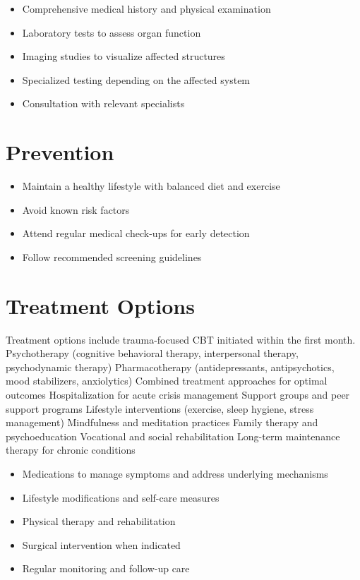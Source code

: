 \begin{itemize}[noitemsep]
  \item Comprehensive medical history and physical examination
  \item Laboratory tests to assess organ function
  \item Imaging studies to visualize affected structures
  \item Specialized testing depending on the affected system
  \item Consultation with relevant specialists
\end{itemize}
\section{Prevention}
\begin{itemize}[noitemsep]
  \item Maintain a healthy lifestyle with balanced diet and exercise
  \item Avoid known risk factors
  \item Attend regular medical check-ups for early detection
  \item Follow recommended screening guidelines
\end{itemize}
\section{Treatment Options}
Treatment options include trauma-focused CBT initiated within the first month. Psychotherapy (cognitive behavioral therapy, interpersonal therapy, psychodynamic therapy) Pharmacotherapy (antidepressants, antipsychotics, mood stabilizers, anxiolytics) Combined treatment approaches for optimal outcomes Hospitalization for acute crisis management Support groups and peer support programs Lifestyle interventions (exercise, sleep hygiene, stress management) Mindfulness and meditation practices Family therapy and psychoeducation Vocational and social rehabilitation Long-term maintenance therapy for chronic conditions

\begin{itemize}[noitemsep]
  \item Medications to manage symptoms and address underlying mechanisms
  \item Lifestyle modifications and self-care measures
  \item Physical therapy and rehabilitation
  \item Surgical intervention when indicated
  \item Regular monitoring and follow-up care
\end{itemize}
